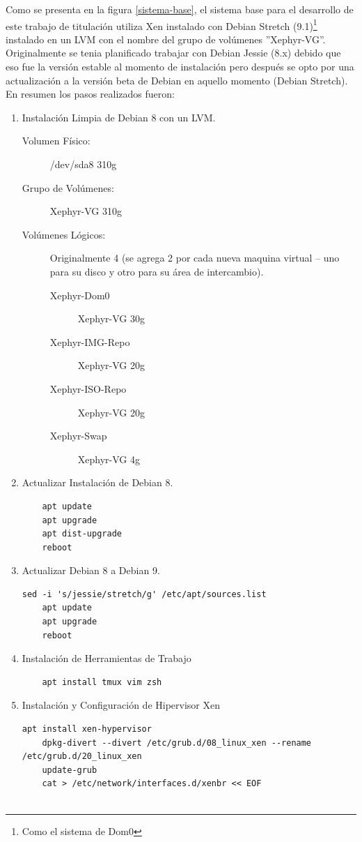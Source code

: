 Como se presenta en la figura \ref{sistema-base}, el sistema base para el desarrollo de este trabajo de titulación utiliza Xen instalado con Debian Stretch (9.1)\footnote{Como el sistema de Dom0} instalado en un LVM con el nombre del grupo de volúmenes ''Xephyr-VG''. Originalmente se tenia planificado trabajar con Debian Jessie (8.x) debido que eso fue la versión estable al momento de instalación pero después se opto por una actualización a la versión beta de Debian en aquello momento (Debian Stretch). En resumen los pasos realizados fueron:
\lstset{language=Bash}
\begin{enumerate}
	\item Instalación Limpia de Debian 8 con un LVM.
    	\begin{description}
    		\item[Volumen Físico:] /dev/sda8 310g 
            \item[Grupo de Volúmenes:] Xephyr-VG 310g
            \item[Volúmenes Lógicos:] Originalmente 4 (se agrega 2 por cada nueva maquina virtual -- uno para su disco y otro para su área de intercambio).
            \begin{description}
            	\item[Xephyr-Dom0] Xephyr-VG 30g
                \item[Xephyr-IMG-Repo] Xephyr-VG 20g
                \item[Xephyr-ISO-Repo] Xephyr-VG 20g
                \item[Xephyr-Swap] Xephyr-VG 4g
            \end{description}
    	\end{description}
    \item Actualizar Instalación de Debian 8.
    	\begin{lstlisting}
	apt update
	apt upgrade
	apt dist-upgrade
	reboot
        \end{lstlisting}
    \item Actualizar Debian 8 a Debian 9.
        \begin{lstlisting}[breaklines=true]
	sed -i 's/jessie/stretch/g' /etc/apt/sources.list
	apt update
	apt upgrade
	reboot
        \end{lstlisting}
    \item Instalación de Herramientas de Trabajo
        \begin{lstlisting}
	apt install tmux vim zsh
        \end{lstlisting}
    \item Instalación y Configuración de Hipervisor Xen
		\begin{lstlisting}[breaklines=true]
	apt install xen-hypervisor
	dpkg-divert --divert /etc/grub.d/08_linux_xen --rename /etc/grub.d/20_linux_xen
	update-grub
	cat > /etc/network/interfaces.d/xenbr << EOF


\end{lstlisting}
\end{enumerate}
